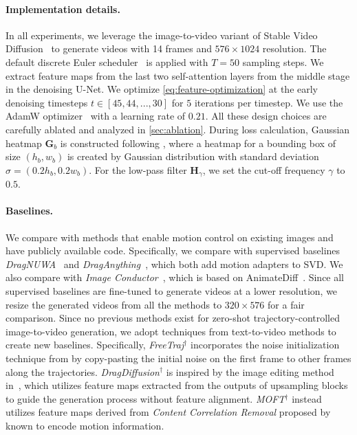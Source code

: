 \documentclass{article} \usepackage{iclr2025_conference,times}
\begin{document}
\paragraph{Implementation details.}
In all experiments, we leverage the image-to-video variant of Stable Video Diffusion~\citep{blattmann2023stable} to generate videos with 14 frames and $576 \times 1024$ resolution. 
The default discrete Euler scheduler~\citep{karras2022elucidating} is applied with $T=50$ sampling steps.
We extract feature maps from the last two self-attention layers from the middle stage in the denoising U-Net. We optimize \cref{eq:feature-optimization} at the early denoising timesteps $t \in [45, 44, ..., 30]$ for $5$ iterations per timestep.
We use the AdamW optimizer~\citep{adamw} with a learning rate of $0.21$.
All these design choices are carefully ablated and analyzed in \cref{sec:ablation}.
During loss calculation, Gaussian heatmap $\bm{G}_{b}$ is constructed following \citep{wu2024draganything}, where a heatmap for a bounding box of size $(h_b, w_b)$ is created by Gaussian distribution with standard deviation $\sigma = (0.2h_b, 0.2w_b)$.
For the low-pass filter $\mathbf{H}_\gamma$, we set the cut-off frequency $\gamma$ to $0.5$. 

\paragraph{Baselines.}
We compare with methods that enable motion control on existing images and have publicly available code.
Specifically, we compare with supervised baselines \textit{DragNUWA}~\citep{yin2023dragnuwa} and \textit{DragAnything}~\citep{wu2024draganything}, which both add motion adapters to SVD.
We also compare with \textit{Image Conductor}~\citep{li2024image}, which is based on AnimateDiff~\citep{AnimateDiff}.
Since all supervised baselines are fine-tuned to generate videos at a lower resolution, we resize the generated videos from all the methods to $320 \times 576$ for a fair comparison. Since no previous methods exist for zero-shot trajectory-controlled image-to-video generation, we adopt techniques from text-to-video methods to create new baselines.
Specifically, \textit{FreeTraj$^\dagger$} incorporates the noise initialization technique from \citep{qiu2024freetraj} by copy-pasting the initial noise on the first frame to other frames along the trajectories.
\textit{DragDiffusion$^\dagger$} is inspired by the image editing method in~\citep{shi2024dragdiffusion}, which utilizes feature maps extracted from the outputs of upsampling blocks to guide the generation process without feature alignment. \textit{MOFT$^\dagger$} instead utilizes feature maps derived from \textit{Content Correlation Removal} proposed by \citet{MOFT} known to encode motion information.
\end{document}

